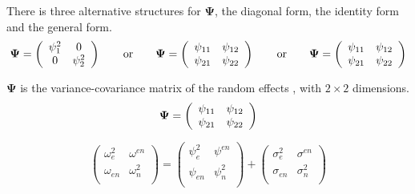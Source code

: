 \documentclass[12pt, a4paper]{report}
\theoremstyle{plain}
\theoremstyle{definition}
\theoremstyle{remark}
\begin{document}
There is three alternative structures for
$\boldsymbol{\Psi}$, the diagonal form, the identity form and the general form.
\[
\boldsymbol{\Psi} =
\left(%
\begin{array}{c c}
\psi^2_1 & 0  \\
0 & \psi^2_2  \\
\end{array}%
\right)\qquad \mathrm{or} \qquad \boldsymbol{\Psi} =
\left(%
\begin{array}{c c}
\psi_{11} & \psi_{12}  \\
\psi_{21} & \psi_{22}  \\
\end{array}%
\right)
\qquad \mathrm{or} \qquad \boldsymbol{\Psi} =
\left(%
\begin{array}{c c}
\psi_{11} & \psi_{12}  \\
\psi_{21} & \psi_{22}  \\
\end{array}%
\right)
\]

$\boldsymbol{\Psi}$ is the variance-covariance matrix of the random effects ,
with $2 \times 2$ dimensions.
\begin{equation}
\boldsymbol{\Psi} =
\left(%
\begin{array}{c c}
\psi_{11} & \psi_{12}  \\
\psi_{21} & \psi_{22}  \\
\end{array}%
\right)
\end{equation}



\newpage


\begin{equation}
\left( \begin{array}{cc}
\omega^2_{e} & \omega^{en} \\
\omega_{en} & \omega^2_{n} \\
\end{array}\right)
=
\left( \begin{array}{cc}
\psi^2_{e} & \psi^{en} \\
\psi_{en} & \psi^2_{n} \\
\end{array}\right)
+
\left( \begin{array}{cc}
\sigma^2_{e} & \sigma^{en} \\
\sigma_{en} & \sigma^2_{n} \\
\end{array}\right)
\end{equation}
\end{document}
